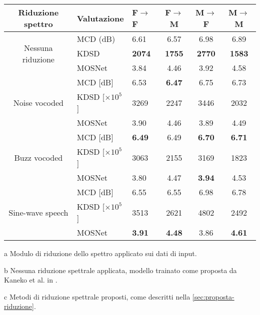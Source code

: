 \def\arraystretch{1.3}
\begin{table}[h]
	\centering
	\begin{threeparttable}
	\begin{tabular*} {\textwidth}{c @{\extracolsep{\fill}} llccc}
		\toprule
		\textbf{Riduzione spettro}\tnote{a}         & \textbf{Valutazione} & \textbf{F$\rightarrow$F} & \textbf{F$\rightarrow$M} & \textbf{M$\rightarrow$F} & \textbf{M$\rightarrow$M} \\ \hline
		\multirow{3}{*}{Nessuna riduzione \tnote{b}}        & MCD (dB) & 6.61          & 6.57          & 6.98          & 6.89          \\
		& KDSD     & \textbf{2074} & \textbf{1755} & \textbf{2770} & \textbf{1583} \\
		& MOSNet   & 3.84          & 4.46          & 3.92          & 4.58          \\ \hline
		\multirow{3}{*}{Noise vocoded\tnote{c}}     & MCD [dB] & 6.53          & \textbf{6.47} & 6.75          & 6.73          \\
		& KDSD [$\times 10^5$]     & 3269          & 2247          & 3446          & 2032          \\
		& MOSNet   & 3.90          & 4.46          & 3.89          & 4.49          \\ \hline
		\multirow{3}{*}{Buzz vocoded\tnote{c}}  & MCD [dB]             & \textbf{6.49}              & 6.49                       & \textbf{6.70}              & \textbf{6.71}              \\
		& KDSD [$\times 10^5$]     & 3063          & 2155          & 3169          & 1823          \\
		& MOSNet   & 3.80          & 4.47          & \textbf{3.94} & 4.53          \\ \hline
		\multirow{3}{*}{Sine-wave speech\tnote{c}}  & MCD [dB] & 6.55          & 6.55          & 6.98          & 6.78          \\
		& KDSD [$\times 10^5$]     & 3513          & 2621          & 4802          & 2492          \\
		& MOSNet   & \textbf{3.91} & \textbf{4.48} & 3.86          & \textbf{4.61} \\
		\bottomrule
	\end{tabular*}
	\begin{tablenotes}
		\item[a] Modulo di riduzione dello spettro applicato sui dati di input.
		\item[b] Nessuna riduzione spettrale applicata, modello trainato come proposta da Kaneko et al. in \cite{MaskCyclegan-VC}.
		\item[c] Metodi di riduzione spettrale proposti, come descritti nella \autoref{sec:proposta-riduzione}.
	\end{tablenotes}
\end{threeparttable}
\end{table}